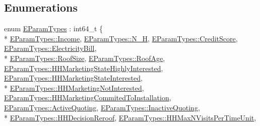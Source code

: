 \subsection*{Enumerations}
\begin{DoxyCompactItemize}
\item 
enum \hyperlink{namespacesolar__core_aa1147341e5ef7a40d68d1bd68e149362}{E\+Param\+Types} \+: int64\+\_\+t \{ \\*
\hyperlink{namespacesolar__core_aa1147341e5ef7a40d68d1bd68e149362a1f08d08fd864b99cbeebd88b9a0784a7}{E\+Param\+Types\+::\+Income}, 
\hyperlink{namespacesolar__core_aa1147341e5ef7a40d68d1bd68e149362a62c5cc90270449db38e6fb4f2db71c55}{E\+Param\+Types\+::\+N\+\_\+\+H}, 
\hyperlink{namespacesolar__core_aa1147341e5ef7a40d68d1bd68e149362a417bef7b89fce8abf638b9983a79a70e}{E\+Param\+Types\+::\+Credit\+Score}, 
\hyperlink{namespacesolar__core_aa1147341e5ef7a40d68d1bd68e149362a9b8cd62150c419c61129f736404b0579}{E\+Param\+Types\+::\+Electricity\+Bill}, 
\\*
\hyperlink{namespacesolar__core_aa1147341e5ef7a40d68d1bd68e149362a2bf6593af19bb602f7c596d7327c6dd6}{E\+Param\+Types\+::\+Roof\+Size}, 
\hyperlink{namespacesolar__core_aa1147341e5ef7a40d68d1bd68e149362abff61b25127aa53b8eb7343edf48166b}{E\+Param\+Types\+::\+Roof\+Age}, 
\hyperlink{namespacesolar__core_aa1147341e5ef7a40d68d1bd68e149362afc91168d2e624505b0168a1ee8c0c60e}{E\+Param\+Types\+::\+H\+H\+Marketing\+State\+Highly\+Interested}, 
\hyperlink{namespacesolar__core_aa1147341e5ef7a40d68d1bd68e149362a985f6ff4deb35454155c9e992bfcdbb0}{E\+Param\+Types\+::\+H\+H\+Marketing\+State\+Interested}, 
\\*
\hyperlink{namespacesolar__core_aa1147341e5ef7a40d68d1bd68e149362ab970e992ff02930a86716c0390fa42df}{E\+Param\+Types\+::\+H\+H\+Marketing\+Not\+Interested}, 
\hyperlink{namespacesolar__core_aa1147341e5ef7a40d68d1bd68e149362a42738f4a30d12c1ac8b64e1a4ce75b4f}{E\+Param\+Types\+::\+H\+H\+Marketing\+Commited\+To\+Installation}, 
\hyperlink{namespacesolar__core_aa1147341e5ef7a40d68d1bd68e149362a5a8012f218ced859bad78be09e8e46e7}{E\+Param\+Types\+::\+Active\+Quoting}, 
\hyperlink{namespacesolar__core_aa1147341e5ef7a40d68d1bd68e149362a31ead751600c8439e0897f8dc736154b}{E\+Param\+Types\+::\+Inactive\+Quoting}, 
\\*
\hyperlink{namespacesolar__core_aa1147341e5ef7a40d68d1bd68e149362a374a1855dae7569f1de9514f0cdf09f5}{E\+Param\+Types\+::\+H\+H\+Decision\+Reroof}, 
\hyperlink{namespacesolar__core_aa1147341e5ef7a40d68d1bd68e149362a4580119737f0c25977ece80cbac3d58b}{E\+Param\+Types\+::\+H\+H\+Max\+N\+Visits\+Per\+Time\+Unit}, 

\end{DoxyCompactItemize}

